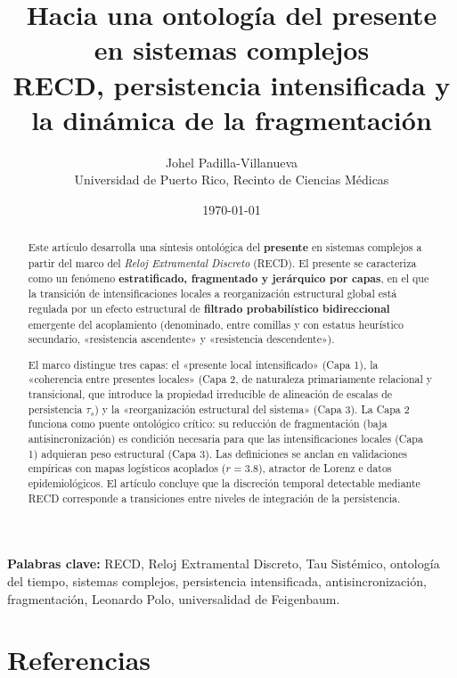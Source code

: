 \documentclass[11pt,a4paper]{article}
\title{\textbf{Hacia una ontología del presente en sistemas complejos}\\[0.3em]
\large RECD, persistencia intensificada y la dinámica de la fragmentación}
\author{Johel Padilla-Villanueva\\
\small Universidad de Puerto Rico, Recinto de Ciencias Médicas}
\date{\today}
\begin{document}
\maketitle

\begin{abstract}
Este artículo desarrolla una síntesis ontológica del \textbf{presente} en sistemas complejos a partir del marco del \textit{Reloj Extramental Discreto} (RECD). El presente se caracteriza como un fenómeno \textbf{estratificado, fragmentado y jerárquico por capas}, en el que la transición de intensificaciones locales a reorganización estructural global está regulada por un efecto estructural de \textbf{filtrado probabilístico bidireccional} emergente del acoplamiento (denominado, entre comillas y con estatus heurístico secundario, «resistencia ascendente» y «resistencia descendente»).

El marco distingue tres capas: el «presente local intensificado» (Capa 1), la «coherencia entre presentes locales» (Capa 2, de naturaleza primariamente relacional y transicional, que introduce la propiedad irreducible de alineación de escalas de persistencia $\tau_s$) y la «reorganización estructural del sistema» (Capa 3). La Capa 2 funciona como puente ontológico crítico: su reducción de fragmentación (baja antisincronización) es condición necesaria para que las intensificaciones locales (Capa 1) adquieran peso estructural (Capa 3). Las definiciones se anclan en validaciones empíricas con mapas logísticos acoplados ($r=3.8$), atractor de Lorenz e datos epidemiológicos. El artículo concluye que la discreción temporal detectable mediante RECD corresponde a transiciones entre niveles de integración de la persistencia.
\end{abstract}

\noindent\textbf{Palabras clave:} RECD, Reloj Extramental Discreto, Tau Sistémico, ontología del tiempo, sistemas complejos, persistencia intensificada, antisincronización, fragmentación, Leonardo Polo, universalidad de Feigenbaum.

\newpage
\tableofcontents
\newpage










\section*{Referencias}

\sloppy

\normalfont
\end{document}
